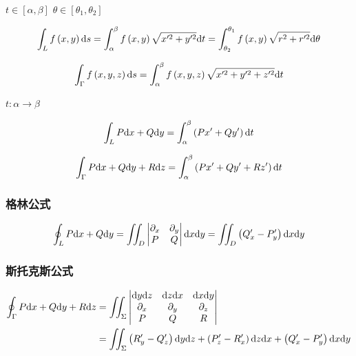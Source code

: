 \documentclass{article}
\begin{document}
\begin{definition}[第一类]

    $t\in\left[\alpha,\beta\right]$
    $\theta\in\left[\theta_1,\theta_2\right]$

    \[\int_L f\left(x,y\right)\mathrm d s
        =\int^\beta_\alpha f\left(x,y\right)\sqrt{x^{\prime 2}+y^{\prime 2}}\mathrm d t
        =\int_{\theta_2}^{\theta_1}f\left(x,y\right)\sqrt{r^2+r^{\prime2}}\mathrm d\theta\]

    \[\int_\Gamma f\left(x,y,z\right)\mathrm d s
        =\int^\beta_\alpha f\left(x,y,z\right)\sqrt{x^{\prime 2}+y^{\prime 2}+z^{\prime 2}}\mathrm d t\]
\end{definition}

\begin{definition}

    $t:\alpha\to\beta$

    \[\int_LP\mathrm d x+Q\mathrm d y=
        \int^\beta_\alpha\left(Px^\prime+Qy^\prime\right)\mathrm d t\]

    \[\int_\Gamma P\mathrm d x+Q\mathrm d y+R\mathrm d z=
        \int^\beta_\alpha\left(Px^\prime+Qy^\prime+Rz^\prime\right)\mathrm d t\]
\end{definition}

\subsubsection{格林公式}

\[\oint_LP\mathrm d x+Q\mathrm d y
    =\iint_D\begin{vmatrix}
        \partial_x & \partial_y \\
        P          & Q
    \end{vmatrix}\mathrm d x\mathrm d y
    =\iint_D\left(Q^\prime_x-P^\prime_y\right)\mathrm d x\mathrm d y\]

\subsubsection{斯托克斯公式}

\[\begin{aligned}
        \oint_\Gamma P\mathrm d x+Q\mathrm d y+R\mathrm d z
         & =\iint_\Sigma\begin{vmatrix}
                            \mathrm d y\mathrm d z   & \mathrm d z\mathrm d x   & \mathrm d x\mathrm d y   \\
                            \partial_x & \partial_y & \partial_z \\
                            P          & Q          & R
                        \end{vmatrix} \\
         & =\iint_\Sigma
        \left(R_y^\prime-Q_z^\prime\right)\mathrm d y\mathrm d z+
        \left(P_z^\prime-R_x^\prime\right)\mathrm d z\mathrm d x+
        \left(Q_x^\prime-P_y^\prime\right)\mathrm d x\mathrm d y
    \end{aligned}\]
\end{document}
